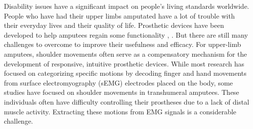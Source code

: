 \documentclass{elektr}
\begin{document}
Disability issues have a significant impact on people's living standards worldwide. People who have had their upper limbs amputated have a lot of trouble with their everyday lives and their quality of life. Prosthetic devices have been developed to help amputees regain some functionality \cite{prakash2020force}, \cite{desplenter2020rehabilitative}. But there are still many challenges to overcome to improve their usefulness and efficacy. For upper-limb amputees, shoulder movements often serve as a compensatory mechanism for the development of responsive, intuitive prosthetic devices. While most research has focused on categorizing specific motions by decoding finger and hand movements from surface electromyography (sEMG) electrodes placed on the body, some studies have focused on shoulder movements in transhumeral amputees. These individuals often have difficulty controlling their prostheses due to a lack of distal muscle activity. Extracting these motions from EMG signals is a considerable challenge.\\
\indent
\end{document}
